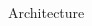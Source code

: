 \documentclass[aspectratio=1610,handout]{beamer}
\begin{document}
\begin{frame}{Architecture}
\begin{onlyenv}
{\begin{columns}
\begin{column}{.3\textwidth}
                \end{column}
            \end{columns}
        }
    \end{onlyenv}
\end{frame}
\end{document}
